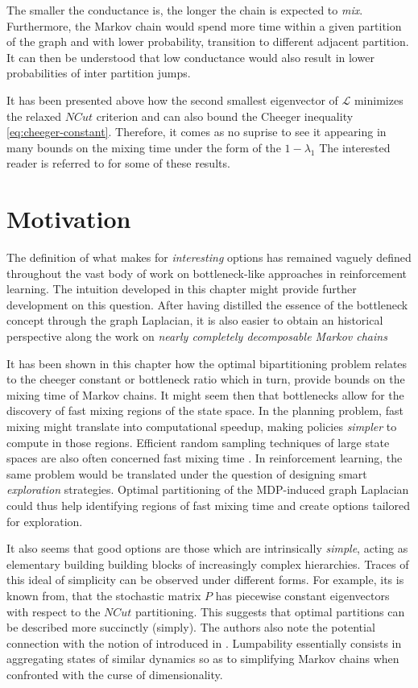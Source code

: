 \documentclass[12pt, oneside, extrafontsizes]{memoir}  %
\def\laplacian{\mathbf{\mathcal{L}}}
\newcommand{\termidx}[1]{\index{#1}{\textbf{#1}}}
\theoremstyle{plain}
\theoremstyle{definition}
\begin{document}
The smaller the conductance is, the longer the chain is expected to \textit{mix}.
Furthermore, the Markov chain would spend more time within a given partition of the
graph and with lower probability, transition to different adjacent partition. It can then be
understood that low conductance would also result in lower probabilities of inter
partition jumps.

It has been presented above how the second smallest eigenvector of $\laplacian$
minimizes the relaxed $NCut$ criterion and can also bound the Cheeger inequality
\ref{eq:cheeger-constant}. Therefore, it comes as no suprise to see it appearing in many
bounds on the mixing time under the form of the \termidx{spectral gap} $1 - \lambda_1$ The interested reader is referred to \cite{Jerrum1988, Lovasz1996,
Levin2008} for some of these results. 
 
\section{Motivation}
\label{sec:ndmc}
The definition of what makes for \textit{interesting} options has remained vaguely
defined throughout the vast body of work on bottleneck-like approaches in
reinforcement learning. The intuition developed in this chapter might provide further
development on this question. After having distilled the essence of the bottleneck
concept through the graph Laplacian, it is also easier to obtain an historical perspective
along the work on \textit{nearly completely decomposable Markov chains}

It has been shown in this chapter how the optimal bipartitioning problem relates to the
cheeger constant or bottleneck ratio which in turn, provide bounds on the mixing time
of Markov chains. It might seem then that bottlenecks allow for the discovery of fast
mixing regions of the state space. In the planning problem, fast mixing might translate
into computational speedup, making policies \textit{simpler} to compute in those
regions. Efficient random sampling techniques of large state spaces are also often
concerned fast mixing time \cite{Boyd2004}. In reinforcement learning, the same
problem would be translated under the question of designing smart \textit{exploration}
strategies. Optimal partitioning of the MDP-induced graph Laplacian could thus help
identifying regions of fast mixing time and create options tailored for exploration.

It also seems that good options are those which are intrinsically \textit{simple}, acting as
elementary building building blocks of increasingly complex hierarchies. Traces of this
ideal of simplicity can be observed under different forms. For example, its is
known from\cite{Shi2001}, that the stochastic matrix $P$ has piecewise constant
eigenvectors with respect to the $NCut$ partitioning. This suggests that optimal
partitions can be described more succinctly (simply). The authors also note the
potential connection with the notion of \termidx{lumpability} introduced in
\cite{Kemeny1976}. Lumpability essentially consists in aggregating states of similar
dynamics so as to simplifying Markov chains when confronted with the curse of
dimensionality. 
\end{document}
